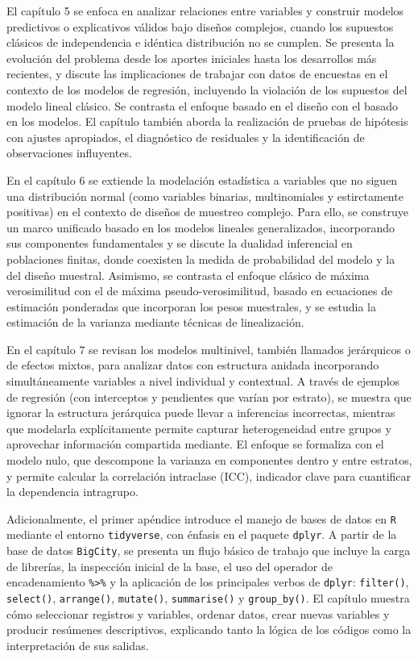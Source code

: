 \documentclass[
  spanish,
  12pt,
]{book}
\begin{document}
El capítulo 5 se enfoca en analizar relaciones entre variables y construir modelos predictivos o explicativos válidos bajo diseños complejos, cuando los supuestos clásicos de independencia e idéntica distribución no se cumplen. Se presenta la evolución del problema desde los aportes iniciales hasta los desarrollos más recientes, y discute las implicaciones de trabajar con datos de encuestas en el contexto de los modelos de regresión, incluyendo la violación de los supuestos del modelo lineal clásico. Se contrasta el enfoque basado en el diseño con el basado en los modelos. El capítulo también aborda la realización de pruebas de hipótesis con ajustes apropiados, el diagnóstico de residuales y la identificación de observaciones influyentes.

En el capítulo 6 se extiende la modelación estadística a variables que no siguen una distribución normal (como variables binarias, multinomiales y estirctamente positivas) en el contexto de diseños de muestreo complejo. Para ello, se construye un marco unificado basado en los modelos lineales generalizados, incorporando sus componentes fundamentales y se discute la dualidad inferencial en poblaciones finitas, donde coexisten la medida de probabilidad del modelo y la del diseño muestral. Asimismo, se contrasta el enfoque clásico de máxima verosimilitud con el de máxima pseudo-verosimilitud, basado en ecuaciones de estimación ponderadas que incorporan los pesos muestrales, y se estudia la estimación de la varianza mediante técnicas de linealización.

En el capítulo 7 se revisan los modelos multinivel, también llamados jerárquicos o de efectos mixtos, para analizar datos con estructura anidada incorporando simultáneamente variables a nivel individual y contextual. A través de ejemplos de regresión (con interceptos y pendientes que varían por estrato), se muestra que ignorar la estructura jerárquica puede llevar a inferencias incorrectas, mientras que modelarla explícitamente permite capturar heterogeneidad entre grupos y aprovechar información compartida mediante. El enfoque se formaliza con el modelo nulo, que descompone la varianza en componentes dentro y entre estratos, y permite calcular la correlación intraclase (ICC), indicador clave para cuantificar la dependencia intragrupo.

Adicionalmente, el primer apéndice introduce el manejo de bases de datos en \texttt{R} mediante el entorno \texttt{tidyverse}, con énfasis en el paquete \texttt{dplyr}. A partir de la base de datos \texttt{BigCity}, se presenta un flujo básico de trabajo que incluye la carga de librerías, la inspección inicial de la base, el uso del operador de encadenamiento \texttt{\%\textgreater{}\%} y la aplicación de los principales verbos de \texttt{dplyr}: \texttt{filter()}, \texttt{select()}, \texttt{arrange()}, \texttt{mutate()}, \texttt{summarise()} y \texttt{group\_by()}. El capítulo muestra cómo seleccionar registros y variables, ordenar datos, crear nuevas variables y producir resúmenes descriptivos, explicando tanto la lógica de los códigos como la interpretación de sus salidas.
\end{document}
